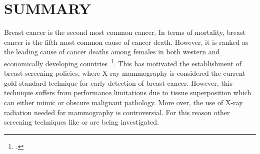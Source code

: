 \documentclass[a4paper,11pt]{article}
\begin{document}


\newpage
\setcounter{tocdepth}{1}
\setcounter{section}{-1}
\tableofcontents

\let\citeBk=\cite
\let\cite=\footcite


\newpage
\section{SUMMARY}
\label{sec:summary}
Breast cancer is the second most common cancer.
In terms of mortality, breast cancer is the fifth most common cause of cancer death.
However, it is ranked as the leading cause of cancer deaths among females in both western and economically developing countries~\cite{cancerStatistics2011}.
This has motivated the establishment of breast screening policies, where X-ray mammography is considered the current gold standard technique for early detection of breast cancer.
 However, this technique suffers from performance limitations due to tissue superposition which can either mimic or obscure malignant pathology.
 More over, the use of X-ray radiation needed for mammography is controversial.
 For this reason other screening techniques like \us or \mri are being investigated.


% 


\end{document}
